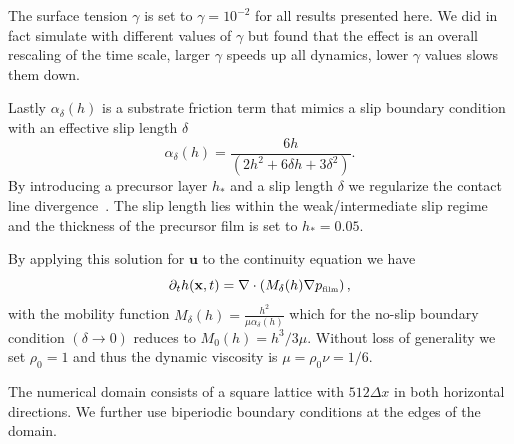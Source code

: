 \documentclass[twoside,twocolumn,9pt]{article}
\begin{document}
The surface tension $\gamma$ is set to $\gamma = 10^{-2}$ for all results presented here.
We did in fact simulate with different values of $\gamma$ but found that the effect is an overall rescaling of the time scale, larger $\gamma$ speeds up all dynamics, lower $\gamma$ values slows them down.

Lastly $\alpha_{\delta}(h)$ is a substrate friction term that mimics a slip boundary condition with an effective slip length $\delta$
\begin{equation}\label{eq:alphafric_app}
\alpha_{\delta}(h) = \frac{6h}{(2 h^2 + 6 \delta h + 3 \delta^2)}.
\end{equation}
By introducing a precursor layer $h_{\ast}$ and a slip length $\delta$ we regularize the contact line divergence~\cite{huhHydrodynamicModelSteady1971}. 
The slip length lies within the weak/intermediate slip regime~\cite{peschkaSignaturesSlipDewetting2019,fetzerQuantifyingHydrodynamicSlip2007, munchLubricationModelsSmall2005} and the thickness of the precursor film is set to $h_{\ast} = 0.05$.

By applying this solution for $\mathbf{u}$ to the continuity equation we have
\begin{equation}\label{eq:thinsolve_app}
     \partial_t h(\mathbf{x},t) = \nabla\cdot\left(M_{\delta}(h)\nabla p_{\mbox{\tiny{film}}}\right),
\end{equation}
with the mobility function $M_{\delta}(h) = \frac{h^2}{\mu\alpha_{\delta}(h)}$ which for the no-slip boundary condition $(\delta \rightarrow 0)$ reduces to $M_{0}(h) = h^3/3\mu$.
Without loss of generality we set $\rho_0 = 1$ and thus the dynamic viscosity is $\mu = \rho_0 \nu = 1/6$. 

The numerical domain consists of a square lattice with $512\Delta x$ in both horizontal directions.
We further use biperiodic boundary conditions at the edges of the domain. 
\end{document}
